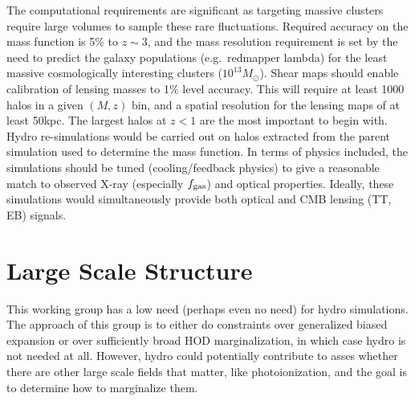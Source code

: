 \documentclass[11pt, margin=1in]{article}
\begin{document}
The computational requirements are significant as targeting massive clusters require large volumes
to sample these rare fluctuations.  Required accuracy on the mass function is 5\% to $z \sim 3$, and 
the mass resolution requirement is set by the need to predict the galaxy populations (e.g.~redmapper lambda)
for the least massive cosmologically interesting clusters ($10^{13} M_{\odot}$).
%
Shear maps should enable calibration of lensing masses to 1\% level accuracy.
This will require at least 1000 halos in a given $(M, z)$ bin, and a spatial resolution for the
lensing maps of at least 50kpc.  The largest halos at $z<1$ are the most important to begin with.
Hydro re-simulations would be carried out on halos extracted from the parent simulation used to determine the mass function.
%
In terms of physics included, the simulations should be tuned (cooling/feedback physics) to give a reasonable
match to observed X-ray (especially $f_{\rm gas}$) and optical properties.  Ideally, these simulations would
simultaneously provide both optical and CMB lensing (TT, EB) signals.


\section{Large Scale Structure}

This working group has a low need (perhaps even no need) for hydro simulations.
The approach of this group is to either do constraints over generalized
biased expansion or over sufficiently broad HOD
marginalization, in which case hydro is not needed at all.
However, hydro could potentially contribute to asses whether there are other large scale fields
that matter, like photoionization, and the goal is to determine how to marginalize them.
\end{document}
